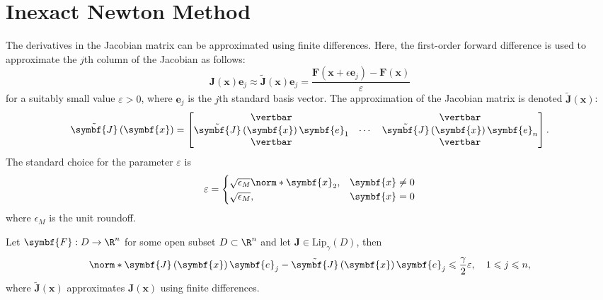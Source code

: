 \documentclass{article}
\begin{document}
\section{Inexact Newton Method}
The derivatives in the Jacobian matrix can be approximated using finite
differences. Here, the first-order forward difference is used to
approximate the \(j\)th column of the Jacobian as follows:
\begin{equation*}
    \symbf{J}\left( \symbf{x} \right) \symbf{e}_j \approx \tilde{\symbf{J}}\left( \symbf{x} \right) \symbf{e}_j = \frac{\symbf{F}\left( \symbf{x} + \epsilon \symbf{e}_j \right) - \symbf{F}\left( \symbf{x} \right)}{\varepsilon}
\end{equation*}
for a suitably small value \(\varepsilon > 0\),
where \(\symbf{e}_j\) is the \(j\)th standard basis vector.
The approximation of the Jacobian matrix is denoted
\(\tilde{\symbf{J}}\left( \symbf{x} \right)\):
\begin{equation*}
    \tilde{\symbf{J}}\left( \symbf{x} \right) =
    \begin{bmatrix}
        \vertbar                                              &        & \vertbar                                              \\
        \tilde{\symbf{J}}\left( \symbf{x} \right) \symbf{e}_1 & \cdots & \tilde{\symbf{J}}\left( \symbf{x} \right) \symbf{e}_n \\
        \vertbar                                              &        & \vertbar
    \end{bmatrix}.
\end{equation*}
The standard choice for the parameter \(\varepsilon\) is
\begin{equation*}
    \varepsilon =
    \begin{cases}
        \sqrt{\epsilon_M} \norm*{\symbf{x}}_2, & \symbf{x} \neq 0 \\
        \sqrt{\epsilon_M},                     & \symbf{x} = 0
    \end{cases}
\end{equation*}
where \(\epsilon_M\) is the unit roundoff.
\begin{theorem}
    Let \(\symbf{F} : D \to \R^n\) for some open subset \(D \subset \R^n\)
    and let \(\symbf{J} \in \mathrm{Lip}_\gamma\left( D \right)\), then
    \begin{equation*}
        \norm*{\symbf{J}\left( \symbf{x} \right) \symbf{e}_j - \tilde{\symbf{J}}\left( \symbf{x} \right) \symbf{e}_j} \leqslant \frac{\gamma}{2} \varepsilon, \quad 1 \leqslant j \leqslant n,
    \end{equation*}
    where \(\tilde{\symbf{J}}\left( \symbf{x} \right)\) approximates
    \(\symbf{J}\left( \symbf{x} \right)\) using finite differences.
\end{theorem}
\end{document}
